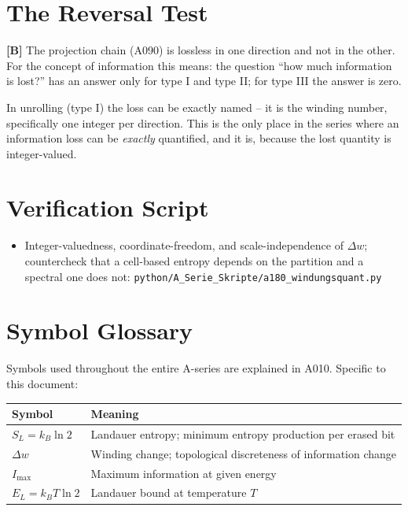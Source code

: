 \section{The Reversal Test}

\textbf{[B]} The projection chain (A090) is lossless in one direction and not in
the other. For the concept of information this means: the question ``how much
information is lost?'' has an answer only for type I and type II; for type III
the answer is zero.

In unrolling (type I) the loss can be exactly named -- it is the winding number,
specifically one integer per direction. This is the only place in the series where
an information loss can be \emph{exactly} quantified, and it is, because the lost
quantity is integer-valued.

\section{Verification Script}

\begin{itemize}
  \item Integer-valuedness, coordinate-freedom, and scale-independence of $\Delta w$;
    countercheck that a cell-based entropy depends on the partition and a spectral
    one does not:
    \texttt{python/A\_Serie\_Skripte/a180\_windungsquant.py}
\end{itemize}

\section{Symbol Glossary}

Symbols used throughout the entire A-series are explained in A010.
Specific to this document:

\begin{center}
\renewcommand{\arraystretch}{1.3}
{\small\begin{tabular}{lp{9cm}}
\toprule
Symbol & Meaning \\
\midrule
$S_L = k_B\ln 2$ & Landauer entropy; minimum entropy production per erased bit \\
$\Delta w$ & Winding change; topological discreteness of information change \\
$I_\text{max}$ & Maximum information at given energy \\
$E_L = k_BT\ln 2$ & Landauer bound at temperature $T$ \\
\bottomrule
\end{tabular}}
\renewcommand{\arraystretch}{1.0}
\end{center}

